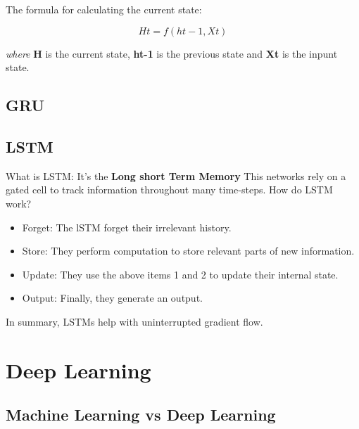 \documentclass[
]{thesis-ekf}
\begin{document}
The formula for calculating the current state:

\[Ht = f(ht-1, Xt)\]

\textit{where} \textbf{H} is the current state, \textbf{ht-1} is the previous state and \textbf{Xt} is the inpunt state.

\subsection{GRU}  %
\subsection{LSTM}
What is LSTM: It's the \textbf{Long short Term Memory} This networks rely on a gated cell to track information throughout many time-steps. How do LSTM work?

\begin{itemize}
	\item Forget: The lSTM forget their irrelevant history.
	
	
	\item Store: They perform computation to store relevant parts of new information.
	
	
	\item Update: They use the above items 1 and 2 to update their internal state.
	
	
	\item Output: Finally, they generate an output.
\end{itemize}

In summary, LSTMs help with uninterrupted gradient flow.

\section{Deep Learning}
\subsection{Machine Learning vs Deep Learning}


\end{document}
